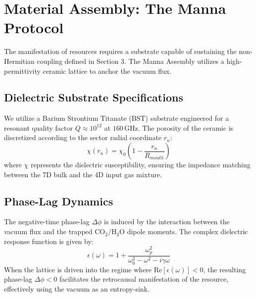 \documentclass[12pt]{article}
\begin{document}
\section{Material Assembly: The Manna Protocol}

The manifestation of resources requires a substrate capable of sustaining the non-Hermitian coupling defined in Section 3. The Manna Assembly utilizes a high-permittivity ceramic lattice to anchor the vacuum flux.

\subsection{Dielectric Substrate Specifications}
We utilize a Barium Strontium Titanate ($\text{BST}$) substrate engineered for a resonant quality factor $Q \approx 10^{12}$ at $160 \, \text{GHz}$. The porosity of the ceramic is discretized according to the sector radial coordinate $r_n$:
\begin{equation}
    \chi(r_n) = \chi_0 \left( 1 - \frac{r_n}{R_{mouth}} \right)
\end{equation}
where $\chi$ represents the dielectric susceptibility, ensuring the impedance matching between the 7D bulk and the 4D input gas mixture.

\subsection{Phase-Lag Dynamics}
The negative-time phase-lag $\Delta \phi$ is induced by the interaction between the vacuum flux and the trapped CO$_2$/H$_2$O dipole moments. The complex dielectric response function is given by:
\begin{equation}
    \epsilon(\omega) = 1 + \frac{\omega_p^2}{\omega_0^2 - \omega^2 - i\gamma \omega}
\end{equation}
When the lattice is driven into the regime where $\text{Re}[\epsilon(\omega)] < 0$, the resulting phase-lag $\Delta \phi < 0$ facilitates the retrocausal manifestation of the resource, effectively using the vacuum as an entropy-sink.
\end{document}
